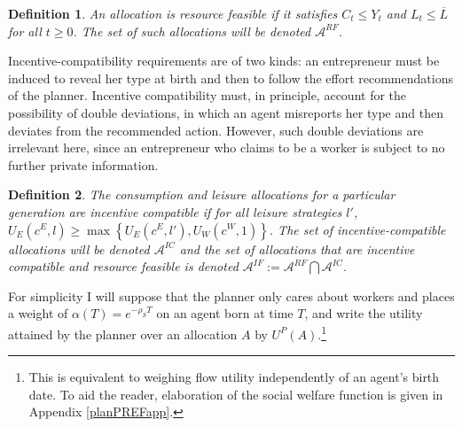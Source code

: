 \documentclass[11pt]{article}
\theoremstyle{plain}
\newtheorem{defn}{Definition}[section]
\begin{document}
\begin{defn}
An allocation is resource feasible if it satisfies $C_t \leq Y_t$ and $L_t \leq \overline{L}$ for all $t\geq0$. The set of such allocations will be denoted $\mathcal{A}^{RF}$.
\end{defn}

Incentive-compatibility requirements are of two kinds: an entrepreneur must be induced to reveal her type at birth and then to follow the effort recommendations of the planner. Incentive compatibility must, in principle, account for the possibility of double deviations, in which an agent misreports her type and then deviates from the recommended action. However, such double deviations are irrelevant here, since an entrepreneur who claims to be a worker is subject to no further private information. 

\begin{defn}
The consumption and leisure allocations for a particular generation are incentive compatible if for all leisure strategies $l'$, $U_E(c^E,l) \geq \max\left\{ U_E(c^E,l'), U_W(c^W,1)\right\}$. The set of incentive-compatible allocations will be denoted $\mathcal{A}^{IC}$ and the set of allocations that are incentive compatible and resource feasible is denoted $\mathcal{A}^{IF} := \mathcal{A}^{RF} \bigcap \mathcal{A}^{IC}$.
\end{defn}


For simplicity I will suppose that the planner only cares about workers and places a weight of $\alpha(T) = e^{-\rho_S T}$ on an agent born at time $T$, and write the utility attained by the planner over an allocation $A$ by $U^P(A)$.\footnote{This is equivalent to weighing flow utility independently of an agent's birth date. To aid the reader, elaboration of the social welfare function is given in Appendix \ref{planPREFapp}.} 
\end{document}

